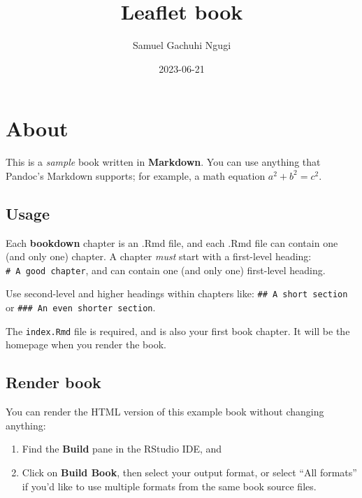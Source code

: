 \documentclass[
]{book}
\title{Leaflet book}
\author{Samuel Gachuhi Ngugi}
\date{2023-06-21}
\begin{document}
\maketitle

{
\setcounter{tocdepth}{1}
\tableofcontents
}
\hypertarget{about}{%
\chapter*{About}\label{about}}

This is a \emph{sample} book written in \textbf{Markdown}. You can use anything that Pandoc's Markdown supports; for example, a math equation \(a^2 + b^2 = c^2\).

\hypertarget{usage}{%
\section*{Usage}\label{usage}}

Each \textbf{bookdown} chapter is an .Rmd file, and each .Rmd file can contain one (and only one) chapter. A chapter \emph{must} start with a first-level heading: \texttt{\#\ A\ good\ chapter}, and can contain one (and only one) first-level heading.

Use second-level and higher headings within chapters like: \texttt{\#\#\ A\ short\ section} or \texttt{\#\#\#\ An\ even\ shorter\ section}.

The \texttt{index.Rmd} file is required, and is also your first book chapter. It will be the homepage when you render the book.

\hypertarget{render-book}{%
\section*{Render book}\label{render-book}}

You can render the HTML version of this example book without changing anything:

\begin{enumerate}
\def\labelenumi{\arabic{enumi}.}
\item
  Find the \textbf{Build} pane in the RStudio IDE, and
\item
  Click on \textbf{Build Book}, then select your output format, or select ``All formats'' if you'd like to use multiple formats from the same book source files.
\end{enumerate}
\end{document}
